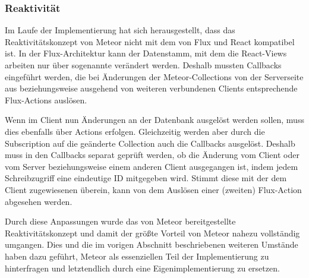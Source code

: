 \subsubsection{Reaktivität}
\label{sssec:elf_reaktivität}

Im Laufe der Implementierung hat sich herausgestellt, dass das
Reaktivitätskonzept von Meteor nicht mit dem von Flux und React kompatibel ist.
In der Flux-Architektur kann der Datenstamm, mit dem die React-Views arbeiten
nur über sogenannte  verändert werden.  Deshalb mussten
Callbacks eingeführt werden, die bei Änderungen der Meteor-Collections von der
Serverseite aus beziehungsweise ausgehend von weiteren verbundenen Clients
entsprechende Flux-Actions auslösen.

Wenn im Client nun Änderungen an der Datenbank ausgelöst werden sollen, muss
dies ebenfalls über Actions erfolgen.  Gleichzeitig werden aber durch die
Subscription auf die geänderte Collection auch die Callbacks ausgelöst.  Deshalb
muss in den Callbacks separat geprüft werden, ob die Änderung vom Client oder
vom Server beziehungsweise einem anderen Client ausgegangen ist, indem jedem
Schreibzugriff eine eindeutige ID mitgegeben wird.  Stimmt diese mit der dem
Client zugewiesenen überein, kann von dem Auslösen einer (zweiten) Flux-Action
abgesehen werden.

Durch diese Anpassungen wurde das von Meteor bereitgestellte
Reaktivitätskonzept und damit der größte Vorteil von Meteor nahezu vollständig
umgangen.  Dies und die im vorigen Abschnitt beschriebenen weiteren Umstände
haben dazu geführt, Meteor als essenziellen Teil der Implementierung zu
hinterfragen und letztendlich durch eine Eigenimplementierung zu ersetzen.
